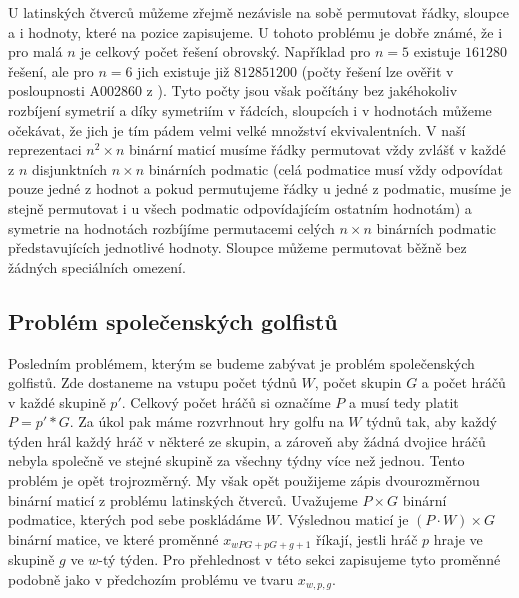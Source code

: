 U latinských čtverců můžeme zřejmě nezávisle na sobě permutovat řádky, sloupce a i hodnoty, které na pozice zapisujeme. U tohoto problému je dobře známé, že i pro malá $n$ je celkový počet řešení obrovský. Například pro $n=5$ existuje $161280$ řešení, ale pro $n=6$ jich existuje již $812851200$ (počty řešení lze ověřit v posloupnosti A002860 z \cite{oeis}). Tyto počty jsou však počítány bez jakéhokoliv rozbíjení symetrií a díky symetriím v řádcích, sloupcích i v hodnotách můžeme očekávat, že jich je tím pádem velmi velké množství ekvivalentních. V naší reprezentaci $n^2\times n$ binární maticí musíme řádky permutovat vždy zvlášť v každé z $n$ disjunktních $n\times n$ binárních podmatic (celá podmatice musí vždy odpovídat pouze jedné z hodnot a pokud permutujeme řádky u jedné z podmatic, musíme je stejně permutovat i u všech podmatic odpovídajícím ostatním hodnotám) a symetrie na hodnotách rozbíjíme permutacemi celých $n\times n$ binárních podmatic představujících jednotlivé hodnoty. Sloupce můžeme permutovat běžně bez žádných speciálních omezení.

\subsection{Problém společenských golfistů}
Posledním problémem, kterým se budeme zabývat je problém společenských golfistů. Zde dostaneme na vstupu počet týdnů $W$, počet skupin $G$ a počet hráčů v každé skupině $p'$. Celkový počet hráčů si označíme $P$ a musí tedy platit $P=p'*G$. Za úkol pak máme rozvrhnout hry golfu na $W$ týdnů tak, aby každý týden hrál každý hráč v některé ze skupin, a zároveň aby žádná dvojice hráčů nebyla společně ve stejné skupině za všechny týdny více než jednou. Tento problém je opět trojrozměrný. My však opět použijeme zápis dvourozměrnou binární maticí z problému latinských čtverců. Uvažujeme $P\times G$ binární podmatice, kterých pod sebe poskládáme $W$. Výslednou maticí je $(P\cdot W)\times G$ binární matice, ve které proměnné $x_{wPG+pG+g+1}$ říkají, jestli hráč $p$ hraje ve skupině $g$ ve $w$-tý týden. Pro přehlednost v této sekci zapisujeme tyto proměnné podobně jako v předchozím problému ve tvaru $x_{w,p,g}$.


